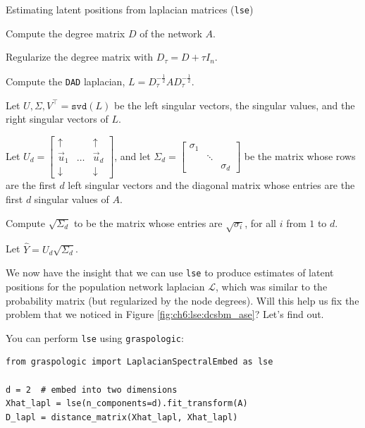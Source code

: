 \begin{algorithm}[h]\caption{Estimating latent positions from laplacian matrices (\texttt{lse})}
\label{alg:ch6:lse}
\SetAlgoLined
Compute the degree matrix $D$ of the network $A$.

Regularize the degree matrix with $D_\tau = D + \tau I_n$.

Compute the \texttt{DAD} laplacian, $L = D_\tau^{-\frac{1}{2}}A D_{\tau}^{-\frac{1}{2}}$.

Let $U, \Sigma, V^\top = \texttt{svd}(L)$ be the left singular vectors, the singular values, and the right singular vectors of $L$.

Let $U_d = \begin{bmatrix}
    \uparrow & & \uparrow \\
    \vec u_1 & \hdots & \vec u_d \\
    \downarrow & & \downarrow
\end{bmatrix}$, and let $\Sigma_d = \begin{bmatrix}
    \sigma_1 & & \\
    & \ddots & \\
    & & \sigma_d
\end{bmatrix}$ be the matrix whose rows are the first $d$ left singular vectors and the diagonal matrix whose entries are the first $d$ singular values of $A$.

Compute $\sqrt{\Sigma_d}$ to be the matrix whose entries are $\sqrt{\sigma_i}$, for all $i$ from $1$ to $d$.

Let $\hat Y = U_d \sqrt{\Sigma_d}$.

\end{algorithm}

We now have the insight that we can use \texttt{lse} to produce estimates of latent positions for the population network laplacian $\mathcal L$, which was similar to the probability matrix (but regularized by the node degrees). Will this help us fix the problem that we noticed in Figure \ref{fig:ch6:lse:dcsbm_ase}? Let's find out.

You can perform \texttt{lse} using \texttt{graspologic}:

\begin{lstlisting}[style=python]
from graspologic import LaplacianSpectralEmbed as lse

d = 2  # embed into two dimensions
Xhat_lapl = lse(n_components=d).fit_transform(A)
D_lapl = distance_matrix(Xhat_lapl, Xhat_lapl)
\end{lstlisting}

